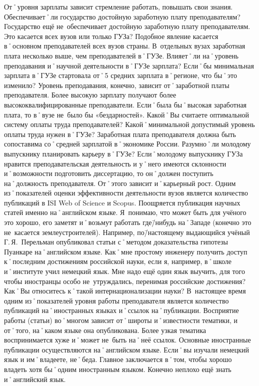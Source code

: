 \begin{drama}
	\michaelspeaks От˚уровня зарплаты зависит стремление работать, повышать свои знания.
	\maxspeaks Обеспечивает˚ли государство достойную заработную плату преподавателям? 
	\michaelspeaks Государство ещё не~обеспечивает достойную заработную плату преподавателям. 
	\maxspeaks Это касается всех вузов или только ГУЗа?
	\michaelspeaks Подобное явление касается в˚основном преподавателей всех вузов страны. В~отдельных вузах заработная плата несколько выше, чем преподавателей в˚ГУЗе.
	\maxspeaks Влияет˚ли на˚уровень преподавания и˚научной деятельности в˚ГУЗе зарплата? Если˚бы минимальная зарплата в˚ГУЗе стартовала от˚5 средних зарплата в˚регионе, что бы˚это изменило?
	\michaelspeaks Уровень преподавания, конечно, зависит от˚заработной платы преподавателя. Более высокую зарплату получают более высококвалифицированные преподаватели. Если˚была бы˚высокая заработная плата, то в˚вузе не~было бы «бездарностей».
	\maxspeaks Какой˚Вы считаете оптимальной систему оплаты труда преподавателей? Какой˚минимальной допустимый уровень оплаты труда нужен в˚ГУЗе?
	\michaelspeaks Заработная плата преподавателя должна быть сопоставима со˚средней зарплатой в˚экономике России.
	\maxspeaks Разумно˚ли молодому выпускнику планировать карьеру в˚ГУЗе?
	\michaelspeaks Если˚молодому выпускнику ГУЗа нравится преподавательская деятельность и у˚него имеются склонности и˚возможности подготовить диссертацию, то он˚должен поступить на˚должность преподавателя. От˚этого зависит и˚карьерный рост.
	\maxspeaks Одним из˚показателей оценки эффективности деятельности вузов является количество публикаций в ISI Web of Science и Scopus. Поощряется публикация научных статей именно на˚английском языке. Я~понимаю, что может быть для учёного это хорошо, его заметят и˚возьмут работать где\=/нибудь на˚Западе (конечно это не~касается землеустроителей). Например, по\=/настоящему выдающийся учёный Г.\,Я.~Перельман опубликовал статьи с˚методом доказательства гипотезы Пуанкаре на˚английском языке. Как˚мне простому инженеру получить доступ к˚последним достижениям российской науки, если я, например, в˚школе и˚институте учил немецкий язык. Мне надо ещё один язык выучить, для того чтобы иностранцы особо не~утруждались, перенимая российские достижения? Как˚Вы относитесь к˚такой интернационализации науки?
	\michaelspeaks В~настоящее время одним из˚показателей уровня работы преподавателя является количество публикаций на˚иностранных языках и˚ссылок на˚публикации. Восприятие работы (статьи) во˚многом зависит от˚широты и˚известности тематики, и от˚того, на˚каком языке она опубликована. Более узкая тематика воспринимается хуже и˚может не~быть на˚неё ссылок. Основные иностранные публикации осуществляются на˚английском языке. Если˚вы изучали немецкий язык и им˚владеете, не˚беда. Главное заключается в˚том, чтобы хорошо владеть хотя бы˚одним иностранным языком. Конечно неплохо ещё знать и˚английский язык.

\end{drama}

